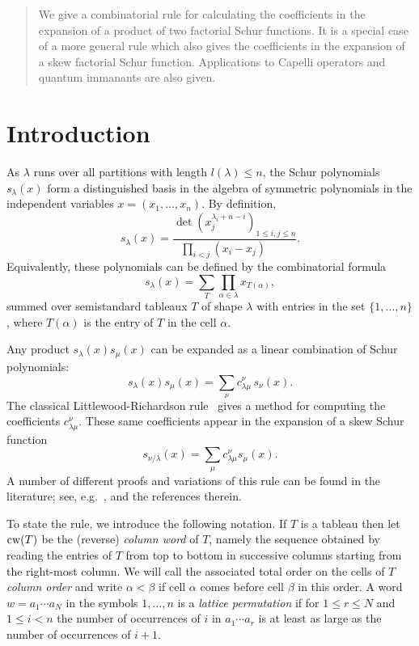 \documentclass[titlepage,12pt]{article}
\newcommand{\beq}{\begin{equation}}
\newcommand{\eeq}{\end{equation}}
\newcommand{\al}{\alpha}
\newcommand{\be}{\beta}
\newcommand{\la}{\lambda}
\newcommand{\0}{{\bf 0}}
\newcommand{\1}{{\bf 1}}
\newcommand{\2}{{\bf 2}}
\newcommand{\3}{{\bf 3}}
\newcommand{\4}{{\bf 4}}
\newcommand{\5}{{\bf 5}}
\newcommand{\6}{{\bf 6}}
\newcommand{\7}{{\bf 7}}
\newcommand{\8}{{\bf 8}}
\newcommand{\9}{{\bf 9}}
\newcommand{\cw}{\mathop{\rm cw}}
\newcommand{\ts}{\,}
\begin{document}
	\begin{abstract}
We give a combinatorial rule for calculating the coefficients in the
expansion of a product of two factorial Schur functions.  It is a
special case of a more general rule which also 
gives the coefficients in the expansion of a skew factorial
Schur function.  Applications to Capelli operators and quantum
immanants are also given. 
	\end{abstract}
\pagestyle{plain}

\section{Introduction}					\label{i}

As $\lambda$ runs over all partitions with length
$l(\lambda)\leq n$,
the Schur polynomials $s_{\lambda}(x)$ form
a distinguished basis in the algebra of symmetric polynomials in
the independent variables $x=(x_1,\dots,x_n)$. By definition,
$$
s_{\lambda}(x)=
\frac{\det (x_j^{\lambda_i+n-i})_{1\leq i,j\leq n}}
{\prod_{i<j}(x_i-x_j)\qquad}.
$$
Equivalently, these polynomials can be defined by the combinatorial
formula
\beq
s_{\lambda}(x)=\sum_{T}
\prod_{\alpha\in\lambda}
x_{T(\alpha)},\label{s(x)}
\eeq
summed over semistandard tableaux $T$ of shape $\lambda$ with
entries in the set $\{1,\dots,n\}$, where $T(\alpha)$ 
is the entry of $T$ in the
cell $\alpha$. 

Any product
$s_{\lambda}(x)s_{\mu}(x)$ can be expanded as a linear
combination of Schur polynomials:
\beq							\label{LR}
s_{\lambda}(x)s_{\mu}(x)=\sum_{\nu} c_{\lambda\mu}^{\nu}\ts s_{\nu}(x).
\eeq
The classical Littlewood-Richardson rule~\cite{lr:gca}
gives a method for computing the coefficients $c_{\lambda\mu}^{\nu}$.
These same coefficients appear in the expansion of a skew Schur
function
$$
s_{\nu/\la}(x)=\sum_\mu c_{\la\mu}^\nu s_\mu(x).
$$
A number of different proofs and
variations of this rule can be found in the literature; see,
e.g.~\cite{mac:sfh,sag:sgr}, and the references therein.

To state the rule, we introduce the following notation. If $T$ is a tableau
then let $\cw(T)$ be the (reverse) {\it column word} of $T$, namely
the sequence obtained by reading the entries of $T$
from top to bottom in successive columns starting from the right-most
column.  We will call the associated total order on the cells of $T$ {\it
column order} and write $\al<\be$ if cell $\al$ comes before cell
$\be$ in this order.
A word $w=a_1\cdots a_N$ in the symbols $1,\dots,n$ is a {\it lattice
permutation\/} if for $1\leq r\leq N$ and $1\leq i< n$ the number
of occurrences of $i$ in $a_1\cdots a_r$ is at least as large as the number
of occurrences of $i+1$.
\end{document}
